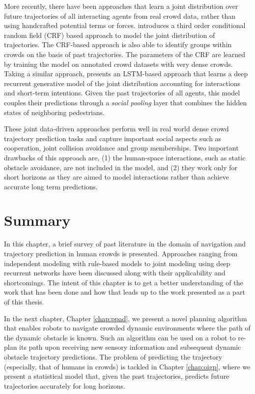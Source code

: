 More recently, there have been approaches that learn a joint distribution over future trajectories of all interacting agents from real crowd data, rather than using handcrafted potential terms or forces. \cite{pellegrini2010improving} introduces a third order conditional random field (CRF) based approach to model the joint distribution of trajectories. The CRF-based approach is also able to identify groups within crowds on the basis of past trajectories. The parameters of the CRF are learned by training the model on annotated crowd datasets with very dense crowds. Taking a similar approach, \cite{alahi16} presents an LSTM-based approach that learns a deep recurrent generative model of the joint distribution accounting for interactions and short-term intentions. Given the past trajectories of all agents, this model couples their predictions through a \textit{social pooling} layer that combines the hidden states of neighboring pedestrians.

These joint data-driven approaches perform well in real world dense crowd trajectory prediction tasks and capture important social aspects such as cooperation, joint collision avoidance and group memberships. Two important drawbacks of this approach are, (1) the human-space interactions, such as static obstacle avoidance, are not included in the model, and (2) they work only for short horizons as they are aimed to model interactions rather than achieve accurate long term predictions.

\section{Summary}
\label{sec:survey-summary}

In this chapter, a brief survey of past literature in the domain of navigation and trajectory prediction in human crowds is presented. Approaches ranging from independent modeling with rule-based models to joint modeling using deep recurrent networks have been discussed along with their applicability and shortcomings. The intent of this chapter is to get a better understanding of the work that has been done and how that leads up to the work presented as a part of this thesis.

In the next chapter, Chapter \ref{chap:ppad}, we present a novel planning algorithm that enables robots to navigate crowded dynamic environments where the path of the dynamic obstacle is known. Such an algorithm can be used on a robot to re-plan its path upon receiving new sensory information and subsequent dynamic obstacle trajectory predictions. The problem of predicting the trajectory (especially, that of humans in crowds) is tackled in Chapter \ref{chap:oigp}, where we present a statistical model that, given the past trajectories, predicts future trajectories accurately for long horizons.

